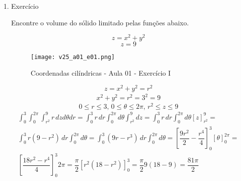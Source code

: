 \begin{enumerate}
	\item Exercício
	
	Encontre o volume do sólido limitado pelas funções abaixo.
	
	\begin{equation*}
		z  = x^2 + y^2	
	\end{equation*}
	\begin{equation*}
		z = 9
	\end{equation*}
	
	\begin{figure}[htb]
		\caption{Coordenadas cilíndricas - Aula 01 - Exercício I}
		\label{v25_a01_e01}
		\centering
		\texttt{[image: v25\_a01\_e01.png]}		
	\end{figure}
		
	\begin{equation*}
		z  = x^2 + y^2 = r^2	
	\end{equation*}
	\begin{gather*}
		x^2 + y^2 = r^2 = 3^2 = 9
	\end{gather*}
	\begin{equation*}
		0 \leq r \leq 3,\, 0 \leq \theta \leq 2\pi,\, r^2 \leq z \leq 9
	\end{equation*}
	\begin{gather*}
		\int_0^3 \int_0^{2\pi} \int_{r^2}^9 r\, dz d\theta dr = \int_0^3 r\, dr \int_0^{2\pi} d\theta \int_{r^2}^9 dz = \int_0^3 r\, dr \int_0^{2\pi} d\theta \left[z\right]_{r^2}^9 =\\ \int_0^3 r\left(9 - r^2\right)\, dr \int_0^{2\pi} d\theta = \int_0^3 \left(9r - r^3\right)\, dr \int_0^{2\pi} d\theta = \left[\dfrac{9r^2}{2} - \dfrac{r^4}{4}\right]_0^3 \left[\theta\right]_0^{2\pi} =\\ \left[\dfrac{18r^2 - r^4}{4}\right]_0^3 2\pi = \dfrac{\pi}{2}\left[r^2\left(18 - r^2\right)\right]_0^3 = \dfrac{\pi}{2}9\left(18 - 9\right) = \dfrac{81\pi}{2}
	\end{gather*}		
\end{enumerate}